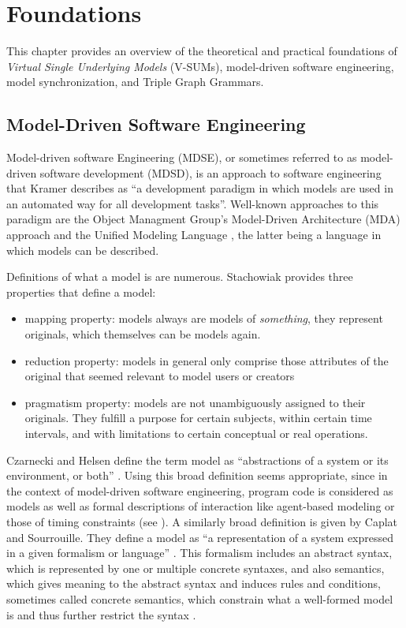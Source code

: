 \chapter{Foundations}
\label{ch:Foundations}
This chapter provides an overview of the theoretical and practical foundations of \emph{Virtual Single Underlying Models} (V-SUMs), model-driven software engineering, model synchronization, and Triple Graph Grammars.

\section{Model-Driven Software Engineering}
\label{sec:Foundations:MDSE}
Model-driven software Engineering (MDSE), or sometimes referred to as model-driven software development (MDSD), is an approach to software engineering that Kramer \cite{kramer_specification_2017} describes as
\enquote{a development paradigm in which models are used in an automated way for all development tasks}.
Well-known approaches to this paradigm are the Object Managment Group's Model-Driven Architecture (MDA) approach \cite{model_driven_architecture_omg} and the  Unified Modeling Language \cite{OMG_UML_2.5.1}, the latter being a language in which models can be described.

Definitions of what a model is are numerous. Stachowiak \cite{stachowiak_allgemeine_modelltheorie_1973} provides three properties that define a model:
\begin{itemize}
    \item mapping property: models always are models of \emph{something}, they represent originals, which themselves can be models again.
    \item reduction property: models in general only comprise those attributes of the original that seemed relevant to model users or creators
    \item pragmatism property: models are not unambiguously assigned to their originals. They fulfill a purpose for certain subjects, within certain time intervals, and with limitations to certain conceptual or real operations.
\end{itemize}
Czarnecki and Helsen define the term model as \enquote{abstractions of a system or its environment, or both} \cite{czarnecki_helsen_feature_based_survey_2006}. Using this broad definition seems appropriate, since in the context of model-driven software engineering, program code is considered as models as well as formal descriptions of interaction like agent-based modeling or those of timing constraints (see \cite{OMG_UML_2.5.1}).
A similarly broad definition is given by Caplat and Sourrouille. They define a model as \enquote{a representation of a system expressed in a given formalism or language} \cite{caplat_model_mapping_MDA_2002}.
This formalism includes an abstract syntax, which is represented by one or multiple concrete syntaxes, and also semantics, which gives meaning to the abstract syntax and induces rules and conditions, sometimes called concrete semantics, which constrain what a well-formed model is and thus further restrict the syntax \cite{harel_modeling_languages_syntax_semantics_2000}.

